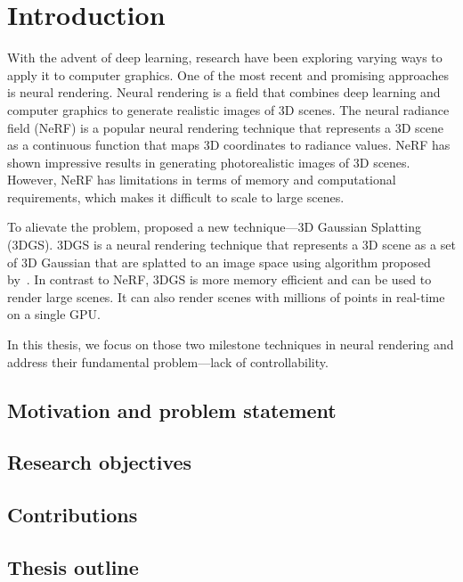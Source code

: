\chapter{Introduction}
\label{chap:introduction}

With the advent of deep learning, research have been exploring varying ways to
apply it to computer graphics.
One of the most recent and promising approaches is neural rendering.
Neural rendering is a field that combines deep learning and computer graphics
to generate realistic images of 3D scenes.
The neural radiance field (NeRF) is a popular neural rendering technique that
represents a 3D scene as a continuous function that maps 3D coordinates to
radiance values.
NeRF has shown impressive results in generating photorealistic images of 3D
scenes.
However, NeRF has limitations in terms of memory and computational
requirements, which makes it difficult to scale to large scenes.

To alievate the problem, \citet{kerbl20233d} proposed a new technique---3D
Gaussian Splatting (3DGS).
3DGS is a neural rendering technique that represents a 3D scene as a set of 3D Gaussian that are splatted to an image space using algorithm proposed by~\citet{zwicker2001ewa}.
In contrast to NeRF, 3DGS is more memory efficient and can be used to render
large scenes.
It can also render scenes with millions of points in real-time on a single
GPU.

In this thesis, we focus on those two milestone techniques in neural rendering
and address their fundamental problem---lack of controllability.

\section{Motivation and problem statement}

\section{Research objectives}

\section{Contributions}

\section{Thesis outline}





